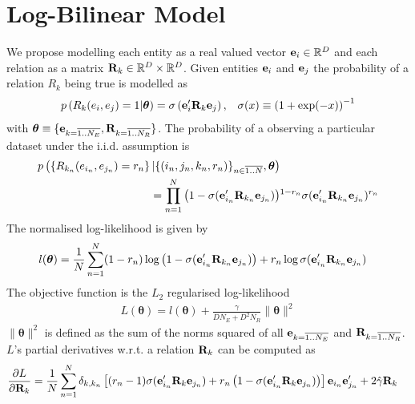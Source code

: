 \documentclass[a4paper, 12pt, fleqn]{article}
\newcommand{\btheta}[0]{\boldsymbol{\theta}}
\begin{document}
\section{Log-Bilinear Model}
We propose modelling each entity as a real valued vector ${\bf e}_i
\in \mathbb{R}^D$ and each relation as a matrix ${\bf R}_k \in
\mathbb{R}^D \times \mathbb{R}^D$. Given entities ${\bf e}_i$ and
${\bf e}_j$ the probability of a relation $R_k$ being true is modelled
as
\begin{align}
  &p\left(R_k(e_i, e_j) = 1\vert \btheta\right) = \sigma\left({\bf
      e}'_i{\bf R}_k{\bf e}_j\right), &\sigma(x) \equiv \left(1 +
    \exp(-x)\right)^{-1}
\end{align}
\noindent with $\btheta \equiv \{{\bf e}_{k=\overline{1..N_E}}, {\bf
  R}_{k=\overline{1..N_R}}\}$. The probability of a observing a
particular dataset under the i.i.d. assumption is
\begin{align}
  \label{eqn:prob_dataset}
  p\left(\left\{R_{k_n}(e_{i_n}, e_{j_n})=r_n\right\}\vert\{(i_n, j_n, k_n,
    r_n)\}_{n\in\overline{1..N}}, \btheta\right)&  \nonumber \\
  = \prod_{n=1}^{N}\left(1 - \sigma({\bf e}'_{i_n}{\bf R}_{k_n}{\bf
     e}_{j_n})\right)&^{1 - r_n}\sigma({\bf e}'_{i_n}{\bf R}_{k_n}{\bf
      e}_{j_n})^{r_n}
\end{align}
The normalised log-likelihood is given by
\begin{align}
  \label{eqn:loglike}
  l(\btheta) = \frac{1}{N}\sum_{n=1}^{N}& (1 - r_n)
\log \left(1 - \sigma({\bf e}'_{i_n}{\bf R}_{k_n}{\bf e}_{j_n})\right)
+ r_n \log \sigma({\bf e}'_{i_n}{\bf R}_{k_n}{\bf e}_{j_n})
\end{align}
\noindent The objective function is the $L_2$ regularised log-likelihood
\begin{align}
  \label{eqn:objective}
  L(\btheta) = l(\btheta) +  \frac{\gamma}{DN_E+ D^2N_R} \|\btheta\|^2
\end{align}
\noindent $\|\btheta\|^2$ is defined as the sum of the norms squared of
all ${\bf e}_{k=\overline{1..N_E}}$ and ${\bf
  R}_{k=\overline{1..N_R}}$. $L$'s partial derivatives
w.r.t. a relation ${\bf R}_k$ can be computed as
\begin{align}
  \label{eqn:objective}
  \frac{\partial L}{\partial {\bf R}_k} &=
  \frac{1}{N}\sum_{n=1}^{N}\delta_{k,k_n}\left[(r_n - 1)\sigma({\bf
      e}'_{i_n}{\bf R}_{k}{\bf e}_{j_n}) + r_n \left( 1 - \sigma({\bf
        e}'_{i_n}{\bf R}_{k}{\bf e}_{j_n}) \right)\right]
  {\bf e}_{i_n}{\bf e}'_{j_n}+ 2\hat\gamma{\bf R}_k
\end{align}
\end{document}
